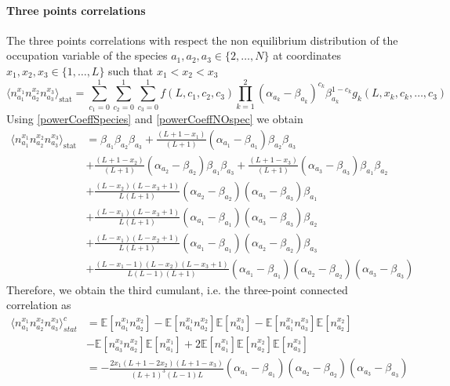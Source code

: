 \documentclass[11pt]{article}
\numberwithin{equation}{section}
\numberwithin{equation}{subsection}
\begin{document}
\paragraph{Three points correlations}
The three points correlations with respect the non equilibrium distribution of the occupation variable of the species $a_{1},a_{2},a_{3}\in \{2,\ldots,N\}$ at coordinates $x_{1},x_{2},x_{3}\in \{1,\ldots,L\}$ such that $x_{1}<x_{2}<x_{3}$
\begin{equation}
    \langle n_{a_{1}}^{x_{1}}n_{a_{2}}^{x_{2}}n_{a_{3}}^{x_{3}}\rangle_{\text{stat}}=\sum_{c_{1}=0}^{1}\sum_{c_{2}=0}^{1}\sum_{c_{3}=0}^{1}f(L,c_{1},c_{2},c_{3})\prod_{k=1}^{2}(\alpha_{a_{k}}-\beta_{a_{k}})^{c_{k}}\beta_{a_{k}}^{1-c_{k}}g_{k}(L,x_{k},c_{k},\ldots,c_{3})
\end{equation}
Using \eqref{powerCoeffSpecies} and \eqref{powerCoeffNOspec} we obtain 
\begin{align}\label{three-pts-corr}
        \langle n_{a_{1}}^{x_{1}}n_{a_{2}}^{x_{2}}n_{a_{3}}^{x_{3}}\rangle_{\text{stat}}&=\beta_{a_{1}}\beta_{a_{2}}\beta_{a_{3}}+\frac{(L+1-x_{1})}{(L+1)}(\alpha_{a_{1}}-\beta_{a_{1}})\beta_{a_{2}}\beta_{a_{3}}
        \\&+\nonumber
        \frac{(L+1-x_{2})}{(L+1)}(\alpha_{a_{2}}-\beta_{a_{2}})\beta_{a_{1}}\beta_{a_{3}}+\frac{(L+1-x_{3})}{(L+1)}(\alpha_{a_{3}}-\beta_{a_{3}})\beta_{a_{1}}\beta_{a_{2}}
        \\&+\nonumber
        \frac{(L-x_{2})(L-x_{3}+1)}{L(L+1)}(\alpha_{a_{2}}-\beta_{a_{2}})(\alpha_{a_{3}}-\beta_{a_{3}})\beta_{a_{1}}
        \\&+\nonumber
        \frac{(L-x_{1})(L-x_{3}+1)}{L(L+1)}(\alpha_{a_{1}}-\beta_{a_{1}})(\alpha_{a_{3}}-\beta_{a_{3}})\beta_{a_{2}}
        \\&+\nonumber
        \frac{(L-x_{1})(L-x_{2}+1)}{L(L+1)}(\alpha_{a_{1}}-\beta_{a_{1}})(\alpha_{a_{2}}-\beta_{a_{2}})\beta_{a_{3}}
        \\&+\nonumber
        \frac{(L-x_{1}-1)(L-x_{2})(L-x_{3}+1)}{L(L-1)(L+1)}(\alpha_{a_{1}}-\beta_{a_{1}})(\alpha_{a_{2}}-\beta_{a_{2}})(\alpha_{a_{3}}-\beta_{a_{3}})
\end{align}
Therefore, we obtain the third cumulant, i.e. the three-point connected correlation as 
\begin{align}
	\langle n_{a_{1}}^{x_{1}}n_{a_{2}}^{x_{2}}n_{a_{3}}^{x_{3}}\rangle_{stat}^{c}&=\mathbb{E}\left[n_{a_{1}}^{x_{1}}n_{a_{2}}^{x_{2}}\right]-\mathbb{E}\left[n_{a_{1}}^{x_{1}}n_{a_{2}}^{x_{2}}\right]\mathbb{E}\left[n_{a_{3}}^{x_{3}}\right]-\mathbb{E}\left[n_{a_{1}}^{x_{1}}n_{a_{3}}^{x_{3}}\right]\mathbb{E}\left[n_{a_{2}}^{x_{2}}\right]\\&-\mathbb{E}\left[n_{a_{3}}^{x_{3}}n_{a_{2}}^{x_{2}}\right]\mathbb{E}\left[n_{a_{1}}^{x_{1}}\right]+2\mathbb{E}\left[n_{a_{1}}^{x_{1}}\right]\mathbb{E}\left[n_{a_{2}}^{x_{2}}\right]\mathbb{E}\left[n_{a_{3}}^{x_{3}}\right]
	\\&=
	-\frac{2x_{1}(L+1-2x_{2})(L+1-x_{3})}{(L+1)^{3}(L-1)L}(\alpha_{a_{1}}-\beta_{a_{1}})(\alpha_{a_{2}}-\beta_{a_{2}})(\alpha_{a_{3}}-\beta_{a_{3}})
\end{align}
\end{document}
